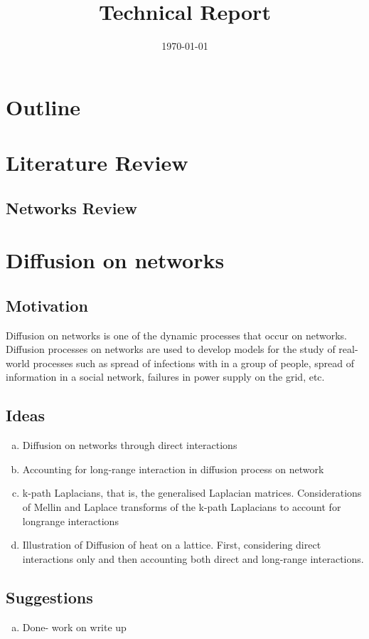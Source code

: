 \documentclass[10pt,a4paper]{article}
\title{Technical Report}
\date{\today}
\begin{document}
	\maketitle
	
	\vspace{1cm}
	\section*{Outline}
	\section{Literature Review}
	\subsection{Networks Review}
	\section{Diffusion on networks}
	\subsection{Motivation}
	Diffusion on networks is one of the dynamic processes that occur on networks. Diffusion processes on networks are used to develop models for the study of real-world processes such as spread of infections with in a group of people, spread of information in a social network, failures in power supply on the grid, etc.
	\subsection{Ideas}
	\begin{enumerate}[a)]
		\item  Diffusion on networks through direct interactions
		\item  Accounting for long-range interaction in diffusion process on network
		\item k-path Laplacians, that is, the generalised Laplacian matrices. Considerations of Mellin and Laplace transforms of the k-path Laplacians to account for longrange interactions
		\item Illustration of Diffusion of heat on a lattice. First, considering direct interactions only and then accounting both direct and long-range interactions. 
	\end{enumerate}
    \subsection{Suggestions}
    \begin{enumerate}[a)]
    	\item  Done- work on write up
    \end{enumerate}
    
\end{document}

